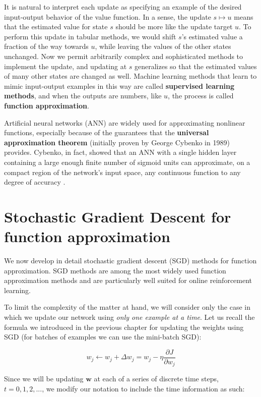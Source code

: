 It is natural to interpret each update as specifying an example of the desired input-output behavior of the value function. In a sense, the update $s \mapsto u$ means that the estimated value for state $s$ should be more like the update target $u$. To perform this update in tabular methods, we would shift $s$’s estimated value a fraction of the way towards $u$, while leaving the values of the other states unchanged. Now we permit arbitrarily complex and sophisticated methods to implement the update, and updating at $s$ generalizes so that the estimated values of many other states are changed as well. Machine learning methods that learn to mimic input-output examples in this way are called \textbf{supervised learning methods}, and when the outputs are numbers, like $u$, the process is called \textbf{function approximation}.

Artificial neural networks (ANN) are widely used for approximating nonlinear functions, especially because of the guarantees that the \textbf{universal approximation theorem} (initially proven by George Cybenko in 1989) provides. Cybenko, in fact, showed that an ANN with a single hidden layer containing a large enough finite number of sigmoid units can approximate, on a compact region of the network’s input space, any continuous function to any degree of accuracy \cite{Cybenko1989ApproximationBS}.

\section{Stochastic Gradient Descent for function approximation}
We now develop in detail stochastic gradient descent (SGD) methods for function approximation. SGD methods are among the most widely used function approximation methods and are particularly well suited for online reinforcement learning.

To limit the complexity of the matter at hand, we will consider only the case in which we update our network using \textit{only one example at a time}. Let us recall the formula we introduced in the previous chapter for updating the weights using SGD (for batches of examples we can use the mini-batch SGD):

\begin{equation}
    w_j \leftarrow w_j + \Delta w_j = w_j - \eta \frac{\partial J}{\partial w_j}
    \label{eq:ch7-singlesgdupdate}
\end{equation}

Since we will be updating $\boldsymbol{w}$ at each of a series of discrete time steps, $t = 0, 1, 2, ...$, we modify our notation to include the time information as such:

